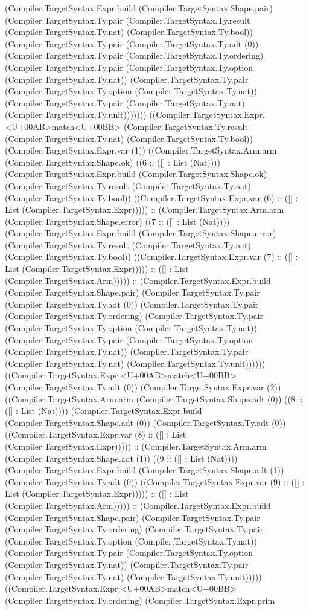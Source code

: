 \documentclass[11pt]{article}
\begin{document}
(Compiler.TargetSyntax.Expr.build (Compiler.TargetSyntax.Shape.pair) (Compiler.TargetSyntax.Ty.pair (Compiler.TargetSyntax.Ty.result (Compiler.TargetSyntax.Ty.nat) (Compiler.TargetSyntax.Ty.bool)) (Compiler.TargetSyntax.Ty.pair (Compiler.TargetSyntax.Ty.adt (0)) (Compiler.TargetSyntax.Ty.pair (Compiler.TargetSyntax.Ty.ordering) (Compiler.TargetSyntax.Ty.pair (Compiler.TargetSyntax.Ty.option (Compiler.TargetSyntax.Ty.nat)) (Compiler.TargetSyntax.Ty.pair (Compiler.TargetSyntax.Ty.option (Compiler.TargetSyntax.Ty.nat)) (Compiler.TargetSyntax.Ty.pair (Compiler.TargetSyntax.Ty.nat) (Compiler.TargetSyntax.Ty.unit))))))) ((Compiler.TargetSyntax.Expr.<U+00AB>match<U+00BB> (Compiler.TargetSyntax.Ty.result (Compiler.TargetSyntax.Ty.nat) (Compiler.TargetSyntax.Ty.bool)) (Compiler.TargetSyntax.Expr.var (1)) ((Compiler.TargetSyntax.Arm.arm (Compiler.TargetSyntax.Shape.ok) ((6 :: ([] : List (Nat)))) (Compiler.TargetSyntax.Expr.build (Compiler.TargetSyntax.Shape.ok) (Compiler.TargetSyntax.Ty.result (Compiler.TargetSyntax.Ty.nat) (Compiler.TargetSyntax.Ty.bool)) ((Compiler.TargetSyntax.Expr.var (6) :: ([] : List (Compiler.TargetSyntax.Expr))))) :: (Compiler.TargetSyntax.Arm.arm (Compiler.TargetSyntax.Shape.error) ((7 :: ([] : List (Nat)))) (Compiler.TargetSyntax.Expr.build (Compiler.TargetSyntax.Shape.error) (Compiler.TargetSyntax.Ty.result (Compiler.TargetSyntax.Ty.nat) (Compiler.TargetSyntax.Ty.bool)) ((Compiler.TargetSyntax.Expr.var (7) :: ([] : List (Compiler.TargetSyntax.Expr))))) :: ([] : List (Compiler.TargetSyntax.Arm))))) :: (Compiler.TargetSyntax.Expr.build (Compiler.TargetSyntax.Shape.pair) (Compiler.TargetSyntax.Ty.pair (Compiler.TargetSyntax.Ty.adt (0)) (Compiler.TargetSyntax.Ty.pair (Compiler.TargetSyntax.Ty.ordering) (Compiler.TargetSyntax.Ty.pair (Compiler.TargetSyntax.Ty.option (Compiler.TargetSyntax.Ty.nat)) (Compiler.TargetSyntax.Ty.pair (Compiler.TargetSyntax.Ty.option (Compiler.TargetSyntax.Ty.nat)) (Compiler.TargetSyntax.Ty.pair (Compiler.TargetSyntax.Ty.nat) (Compiler.TargetSyntax.Ty.unit)))))) ((Compiler.TargetSyntax.Expr.<U+00AB>match<U+00BB> (Compiler.TargetSyntax.Ty.adt (0)) (Compiler.TargetSyntax.Expr.var (2)) ((Compiler.TargetSyntax.Arm.arm (Compiler.TargetSyntax.Shape.adt (0)) ((8 :: ([] : List (Nat)))) (Compiler.TargetSyntax.Expr.build (Compiler.TargetSyntax.Shape.adt (0)) (Compiler.TargetSyntax.Ty.adt (0)) ((Compiler.TargetSyntax.Expr.var (8) :: ([] : List (Compiler.TargetSyntax.Expr))))) :: (Compiler.TargetSyntax.Arm.arm (Compiler.TargetSyntax.Shape.adt (1)) ((9 :: ([] : List (Nat)))) (Compiler.TargetSyntax.Expr.build (Compiler.TargetSyntax.Shape.adt (1)) (Compiler.TargetSyntax.Ty.adt (0)) ((Compiler.TargetSyntax.Expr.var (9) :: ([] : List (Compiler.TargetSyntax.Expr))))) :: ([] : List (Compiler.TargetSyntax.Arm))))) :: (Compiler.TargetSyntax.Expr.build (Compiler.TargetSyntax.Shape.pair) (Compiler.TargetSyntax.Ty.pair (Compiler.TargetSyntax.Ty.ordering) (Compiler.TargetSyntax.Ty.pair (Compiler.TargetSyntax.Ty.option (Compiler.TargetSyntax.Ty.nat)) (Compiler.TargetSyntax.Ty.pair (Compiler.TargetSyntax.Ty.option (Compiler.TargetSyntax.Ty.nat)) (Compiler.TargetSyntax.Ty.pair (Compiler.TargetSyntax.Ty.nat) (Compiler.TargetSyntax.Ty.unit))))) ((Compiler.TargetSyntax.Expr.<U+00AB>match<U+00BB> (Compiler.TargetSyntax.Ty.ordering) (Compiler.TargetSyntax.Expr.prim 
\end{document}
